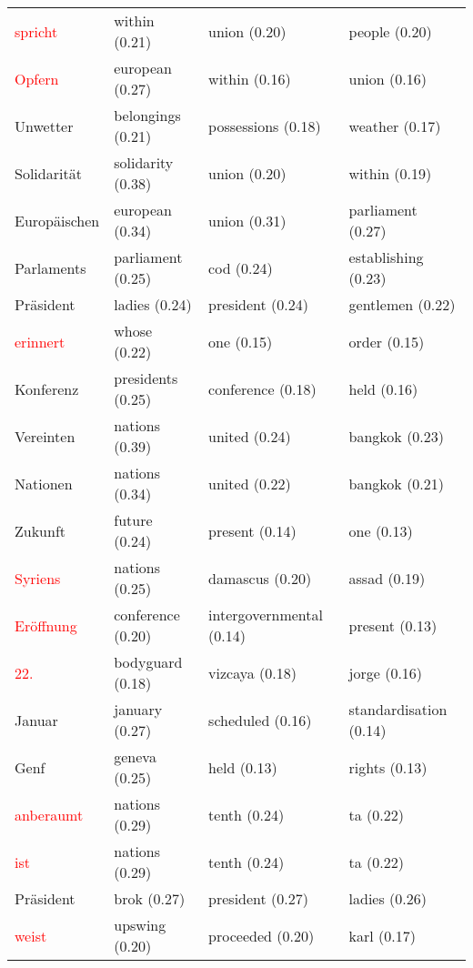 \documentclass[11pt,twoside,openright]{mpreport}
\begin{document}
\begin{scriptsize}
\begin{tabular}{|llll|}
\textcolor{red}{spricht}                 & within (0.21) & union (0.20) & people (0.20) \\
\textcolor{red}{Opfern}                  & european (0.27) & within (0.16) & union (0.16) \\
Unwetter                & belongings (0.21) & possessions (0.18) & weather (0.17) \\ %
Solidarität            & solidarity (0.38) & union (0.20) & within (0.19) \\ %
Europäischen           & european (0.34) & union (0.31) & parliament (0.27) \\ %
Parlaments              & parliament (0.25) & cod (0.24) & establishing (0.23) \\ %
Präsident              & ladies (0.24) & president (0.24) & gentlemen (0.22) \\ %
\textcolor{red}{erinnert}                & whose (0.22) & one (0.15) & order (0.15) \\
Konferenz               & presidents (0.25) & conference (0.18) & held (0.16) \\ %
Vereinten               & nations (0.39) & united (0.24) & bangkok (0.23) \\ %
Nationen                & nations (0.34) & united (0.22) & bangkok (0.21) \\ %
Zukunft                 & future (0.24) & present (0.14) & one (0.13) \\ %
\textcolor{red}{Syriens}                 & nations (0.25) & damascus (0.20) & assad (0.19) \\
\textcolor{red}{Eröffnung}              & conference (0.20) & intergovernmental (0.14) & present (0.13) \\
\textcolor{red}{22.}                     & bodyguard (0.18) & vizcaya (0.18) & jorge (0.16) \\
Januar                  & january (0.27) & scheduled (0.16) & standardisation (0.14) \\ %
Genf                    & geneva (0.25) & held (0.13) & rights (0.13) \\ %
\textcolor{red}{anberaumt}               & nations (0.29) & tenth (0.24) & ta (0.22) \\
\textcolor{red}{ist}                     & nations (0.29) & tenth (0.24) & ta (0.22) \\
Präsident              & brok (0.27) & president (0.27) & ladies (0.26) \\ %
\textcolor{red}{weist}                   & upswing (0.20) & proceeded (0.20) & karl (0.17) \\

\end{tabular}
\end{scriptsize}
\end{document}
